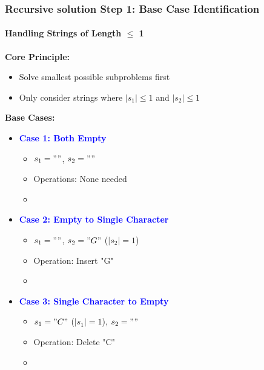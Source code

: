 \documentclass[10pt,aspectratio=43]{beamer}
\begin{document}
\begin{frame}
    \frametitle{Recursive solution Step 1: Base Case Identification}
    \framesubtitle{Handling Strings of Length $\leq$ 1}

    \textbf{Core Principle:}
    \begin{itemize}
        \item Solve smallest possible subproblems first
        \item Only consider strings where $|s_1| \leq 1$ and $|s_2| \leq 1$
    \end{itemize}

    \vspace{0.3cm}
    
    \textbf{Base Cases:}
    \begin{itemize}
        \item \textcolor{blue}{\textbf{Case 1: Both Empty}}
        \begin{itemize}
            \item $s_1 = ""$, $s_2 = ""$
            \item Operations: None needed
            \item {}
        \end{itemize}
        
        \vspace{0.2cm}
        
        \item \textcolor{blue}{\textbf{Case 2: Empty to Single Character}}
        \begin{itemize}
            \item $s_1 = ""$, $s_2 = "G"$ ($|s_2|=1$)
            \item Operation: Insert "G"
            \item {}
        \end{itemize}
        
        \vspace{0.2cm}
        
        \item \textcolor{blue}{\textbf{Case 3: Single Character to Empty}}
        \begin{itemize}
            \item $s_1 = "C"$ ($|s_1|=1$), $s_2 = ""$
            \item Operation: Delete "C"
            \item {}
        \end{itemize}

        \vspace{0.2cm}

        
    \end{itemize}

\end{frame}
\end{document}

